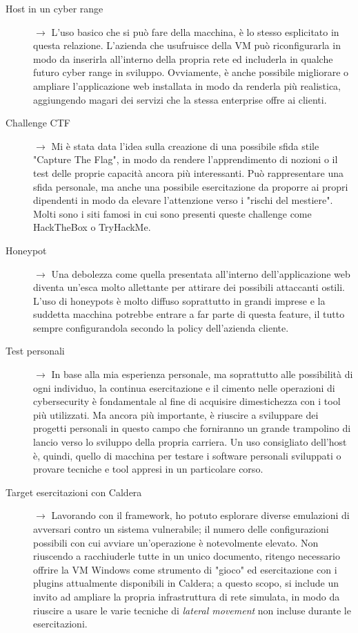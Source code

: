 \begin{description}
    \item[Host in un cyber range] $\rightarrow$ L'uso basico che si può fare della macchina, è lo stesso esplicitato in questa relazione. L'azienda che usufruisce della VM può riconfigurarla in modo da inserirla all'interno della propria rete ed includerla in qualche futuro cyber range in sviluppo. Ovviamente, è anche possibile migliorare o ampliare l'applicazione web installata in modo da renderla più realistica, aggiungendo magari dei servizi che la stessa enterprise offre ai clienti.
    \item[Challenge CTF] $\rightarrow$ Mi è stata data l'idea sulla creazione di una possibile sfida stile "Capture The Flag", in modo da rendere l'apprendimento di nozioni o il test delle proprie capacità ancora più interessanti. Può rappresentare una sfida personale, ma anche una possibile esercitazione da proporre ai propri dipendenti in modo da elevare l'attenzione verso i "rischi del mestiere". Molti sono i siti famosi in cui sono presenti queste challenge come HackTheBox o TryHackMe.
    \item[Honeypot] $\rightarrow$ Una debolezza come quella presentata all'interno dell'applicazione web diventa un'esca molto allettante per attirare dei possibili attaccanti ostili. L'uso di honeypots è molto diffuso soprattutto in grandi imprese e la suddetta macchina potrebbe entrare a far parte di questa feature, il tutto sempre configurandola secondo la policy dell'azienda cliente.
    \item[Test personali] $\rightarrow$ In base alla mia esperienza personale, ma soprattutto alle possibilità di ogni individuo, la continua esercitazione e il cimento nelle operazioni di cybersecurity è fondamentale al fine di acquisire dimestichezza con i tool più utilizzati. Ma ancora più importante, è riuscire a sviluppare dei progetti personali in questo campo che forniranno un grande trampolino di lancio verso lo sviluppo della propria carriera. Un uso consigliato dell'host è, quindi, quello di macchina per testare i software personali sviluppati o provare tecniche e tool appresi in un particolare corso.
    \item[Target esercitazioni con Caldera] $\rightarrow$ Lavorando con il framework, ho potuto esplorare diverse emulazioni di avversari contro un sistema vulnerabile; il numero delle configurazioni possibili con cui avviare un'operazione è notevolmente elevato. Non riuscendo a racchiuderle tutte in un unico documento, ritengo necessario offrire la VM Windows come strumento di "gioco" ed esercitazione con i plugins attualmente disponibili in Caldera; a questo scopo, si include un invito ad ampliare la propria infrastruttura di rete simulata, in modo da riuscire a usare le varie tecniche di \textit{lateral movement} non incluse durante le esercitazioni. 
    
\end{description}